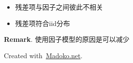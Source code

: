 \documentclass{article}
\begin{document}
{\begin{itemize}[noitemsep,topsep=\mdcompacttopsep]
\item{}残差项与因子之间彼此不相关%

\item{}残差项符合iid分布%
\end{itemize}%

\noindent{}\textbf{Remark}.
使用因子模型的原因是可以减少%

\begin{mdbmargintb}{4em}{}%
\begin{mdflushright}%
{\tiny{}Created with~\href{https://www.madoko.net}{Madoko.net}.}%
\end{mdflushright}%
\end{mdbmargintb}%
}%
\end{document}
